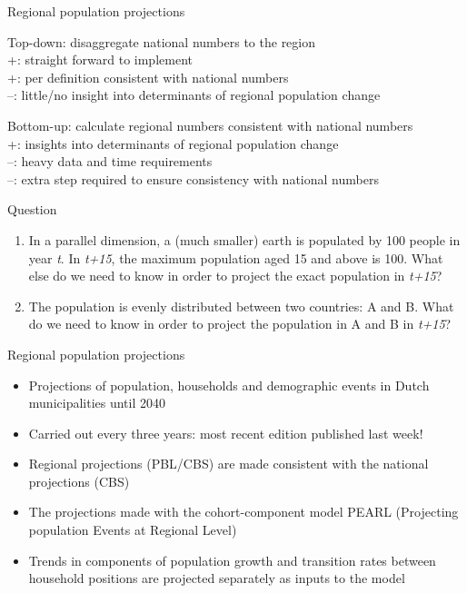 \documentclass[final, 12pt, aspectratio=169, xcolor={dvipsnames}]{beamer}
\begin{document}
\begin{frame}{Regional population projections}
  \begin{minipage}[t]{0.48\linewidth}%
    Top-down: disaggregate national numbers to the region \\
    +: straight forward to implement \\
    +: per definition consistent with national numbers \\
    --: little/no insight into determinants of regional population change
 
\end{minipage}%
\hfill%
\begin{minipage}[t]{0.48\linewidth}
  Bottom-up: calculate regional numbers consistent with national numbers \\

  +: insights into determinants of regional population change \\
  --: heavy data and time requirements \\
  --: extra step required to ensure consistency with national numbers \\
\end{minipage}    
\end{frame}

\begin{frame}{Question}
  \begin{enumerate}
  \item In a parallel dimension, a (much smaller) earth is populated by 100 people in year \textit{t}. In \textit{t+15}, the maximum population aged 15 and above is 100. What else do we need to know in order to project the exact population in \textit{t+15}?
  \item The population is evenly distributed between two countries: A and B. What do we need to know in order to project the population in A and B in \textit{t+15}?
    \end{enumerate}
\end{frame}

\begin{frame}{Regional population projections}
  \begin{itemize}
  \item  Projections of population, households and demographic events in Dutch municipalities until 2040
  \item Carried out every three years: most recent edition published last week!
  \item Regional projections (PBL/CBS) are made consistent with the national projections (CBS)
  \item The projections made with the cohort-component model PEARL (Projecting population Events at Regional Level)
    \item Trends in components of population growth and transition rates between household positions are projected separately as inputs to the model
    \end{itemize}
\end{frame}
\end{document}

